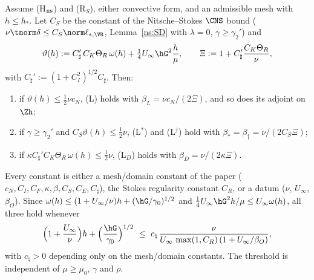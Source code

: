 \begin{theorem}\label{n2:L}
Assume (H$_{\rm ns}$) and (R$_S$), either convective form, and an admissible mesh with $h\le h_\ast$. Let $C_S$ be the constant of the
Nitsche--Stokes $\CNS$ bound ($\nu\tnorm\delta\le C_S\norm\ell_{\ast,\VR}$, Lemma~\ref{ns:SD} with $\lambda=0$, $\gamma\ge\gamma_2'$) and
\[
\vartheta(h):=C_\sharp'\,C_K\Theta_R\,\omega(h)+\tfrac14U_\infty\hG^2\frac h\mu ,\qquad \Xi:=1+C_\sharp'\frac{C_K\Theta_R}\nu ,
\]
with $C_\sharp':=(1+C_I^2)^{1/2}C_\sharp$. Then:
\begin{enumerate}[label=(\alph*)]
\item if $\vartheta(h)\le\frac12\nu c_N$, (L) holds with $\beta_L=\nu c_N/(2\Xi)$, and so does its adjoint on $\Zh$;
\item if $\gamma\ge\gamma_2'$ and $C_S\vartheta(h)\le\frac12\nu$, (L$^\ast$) and (L$^\dagger$) hold with $\beta_\ast=\beta_\dagger=\nu/(2C_S\Xi)$;
\item if $\kappa C_\sharp'C_K\Theta_R\,\omega(h)\le\frac12\nu$, (L$_D$) holds with $\beta_D=\nu/(2\kappa\Xi)$.
\end{enumerate}
Every constant is either a mesh/domain constant of the paper ($c_N,C_I,C_F,\kappa,\beta,C_S,C_E,C_\sharp$), the Stokes regularity constant
$C_R$, or a datum ($\nu$, $U_\infty$, $\beta_O$). Since $\omega(h)\le(1+U_\infty/\nu)h+(\hG/\gamma_0)^{1/2}$ and $\tfrac14U_\infty\hG^2h/\mu\le U_\infty\omega(h)$,
all three hold whenever
\begin{equation}\label{n2:h0}
\Bigl(1+\frac{U_\infty}\nu\Bigr)h+\Bigl(\frac{\hG}{\gamma_0}\Bigr)^{1/2}\ \le\ c_\natural\,\frac{\nu}{U_\infty\,\max(1,C_R)\,(1+U_\infty/\beta_O)},
\end{equation}
with $c_\natural>0$ depending only on the mesh/domain constants. The threshold is independent of $\mu\ge\mu_0$, $\gamma$ and $\rho$.
\end{theorem}

